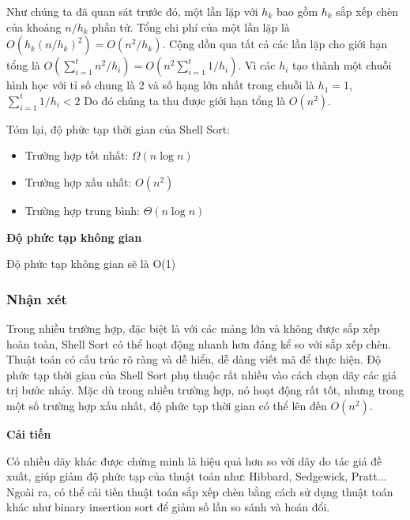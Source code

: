  Như chúng ta đã quan sát trước đó, một lần lặp với $h_k$ bao gồm $h_k$ sắp xếp chèn của khoảng $n/h_k$ phần tử. Tổng chi phí của một lần lặp là $O(h_k(n/h_k)^2)=O(n^2/h_k).$ Cộng dồn qua tất cả các lần lặp cho giới hạn tổng là $O(\sum_{i=1}^{t}n^2/h_i)=O(n^2\sum_{i=1}^{t}1/h_i).$ Vì các $h_i$ tạo thành một chuỗi hình học với tỉ số chung là 2 và số hạng lớn nhất trong chuỗi là $h_1=1$, $\sum_{i=1}^{t}1/h_i<2$ Do đó chúng ta thu được giới hạn tổng là $O(n^2)$.

Tóm lại, độ phức tạp thời gian của Shell Sort: 
 \begin{itemize}
    \item Trường hợp tốt nhất: $\Omega(n\log{n})$ 
    \item Trường hợp xấu nhất: $O(n^2)$
    \item Trường hợp trung bình: $\Theta(n\log{n})$
\end{itemize}

\textbf{Độ phức tạp không gian}

Độ phức tạp không gian sẽ là O(1)


\subsubsection{Nhận xét}
Trong nhiều trường hợp, đặc biệt là với các mảng lớn và không được sắp xếp hoàn toàn, Shell Sort có thể hoạt động nhanh hơn đáng kể so với sắp xếp chèn. Thuật toán có cấu trúc rõ ràng và dễ hiểu, dễ dàng viết mã để thực hiện. 
Độ phức tạp thời gian của Shell Sort phụ thuộc rất nhiều vào cách chọn dãy các giá trị bước nhảy. Mặc dù trong nhiều trường hợp, nó hoạt động rất tốt, nhưng trong một số trường hợp xấu nhất, độ phức tạp thời gian có thể lên đến $O(n^2)$.



\textbf{Cải tiến}


Có nhiều dãy khác được chứng minh là hiệu quả hơn so với dãy do tác giả đề xuất, giúp giảm độ phức tạp của thuật toán như: Hibbard, Sedgewick, Pratt... Ngoài ra, có thể cải tiến thuật toán sắp xếp chèn bằng cách sử dụng thuật toán khác như binary insertion sort để giảm số lần so sánh và hoán đổi.


